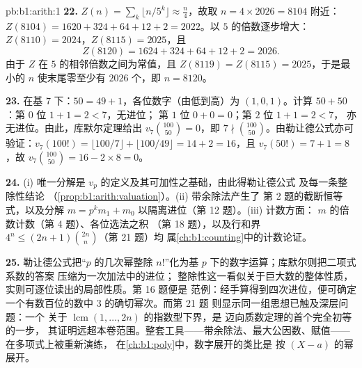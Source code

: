 \begin{solution}{pb:b1:arith:1}
\textbf{22.} $Z(n) = \sum_k\lfloor n/5^k\rfloor \approx \frac
n4$，故取 $n = 4 \times 2026 = 8104$ 附近：$Z(8104) = 1620 +
324 + 64 + 12 + 2 = 2022$。以 $5$ 的倍数逐步增大：$Z(8110)
= 2024$，$Z(8115) = 2025$，且
\[
Z(8120) = 1624 + 324 + 64 + 12 + 2 = 2026 .
\]
由于 $Z$ 在 $5$ 的相邻倍数之间为常值，且 $Z(8119) =
Z(8115) = 2025$，于是最小的 $n$ 使末尾零至少有
$2026$ 个，即 $n = 8120$。

\textbf{23.} 在基 $7$ 下：$50 = 49 + 1$，各位数字（由低到高）为 $(1, 0,
1)$。计算 $50 + 50$：第 $0$ 位 $1 + 1 = 2 < 7$，无进位；
第 $1$ 位 $0 + 0 = 0$；第 $2$ 位 $1 + 1 = 2 < 7$，
亦无进位。由此，库默尔定理给出 $v_7\binom{100}{50} = 0$，即 $7 \nmid
\binom{100}{50}$。由勒让德公式亦可验证：$v_7(100!) = \lfloor 100/7
\rfloor + \lfloor 100/49 \rfloor = 14 + 2 = 16$，且 $v_7(50!) = 7
+ 1 = 8$，故 $v_7\binom{100}{50} = 16 - 2\times8 = 0$。

\textbf{24.} (i) 唯一分解是
$v_p$ 的定义及其可加性之基础，由此得勒让德公式
及每一条整除性结论
（\cref{prop:b1:arith:valuation}）。(ii) 带余除法产生了
第 2 题的截断恒等式，以及分解 $m = p^km_1 +
m_0$ 以隔离进位（第 12 题）。(iii) 计数方面：
$m$ 的倍数计数（第 4 题）、各位选法之积
（第 18 题），以及行和界 $4^n \leq
(2n+1)\binom{2n}n$（第 21 题）均
属\cref{ch:b1:counting}中的计数论证。

\textbf{25.} 勒让德公式把“$p$ 的几次幂整除
$n!$”化为基 $p$ 下的数字运算；库默尔则把二项式系数的答案
压缩为一次加法中的进位；
整除性这一看似关于巨大数的整体性质，
实则可逐位读出的局部性质。第 16 题便是
范例：经手算得到四次进位，便可确定
一个有数百位的数中 $3$ 的确切幂次。而第 21 题
则显示同一组思想已触及深层问题：一个
关于 $\operatorname{lcm}(1, \dots, 2n)$ 的指数型下界，是
迈向质数定理的首个完全初等的一步，
其证明远超本卷范围。整套工具——带余除法、最大公因数、赋值——
在多项式上被重新演练，
在\cref{ch:b1:poly}中，数字展开的类比是
按 $(X - a)$ 的幂展开。
\end{solution}
